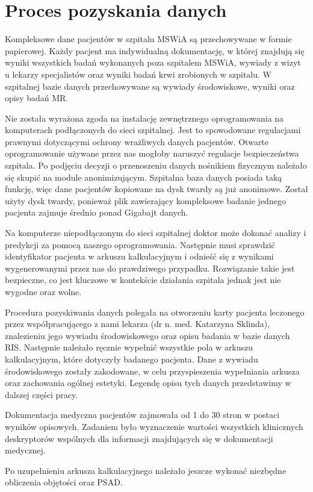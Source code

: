 \documentclass[a4paper,11pt,twoside]{report}
\theoremstyle{definition}
\begin{document}
\section{Proces pozyskania danych}
Kompleksowe dane pacjentów w szpitalu MSWiA są przechowywane w formie papierowej. Każdy pacjent ma indywidualną dokumentację, w której znajdują się wyniki wszystkich badań wykonanych poza szpitalem MSWiA, wywiady z wizyt u lekarzy specjalistów oraz wyniki badań krwi zrobionych w szpitalu. W szpitalnej bazie danych przechowywane są wywiady środowiskowe, wyniki oraz opisy badań MR. 
\par
Nie została wyrażona zgoda na instalację zewnętrznego oprogramowania na komputerach podłączonych do sieci szpitalnej. Jest to spowodowane regulacjami prawnymi dotyczącymi ochrony wrażliwych danych pacjentów. Otwarte oprogramowanie używane przez nas mogłoby naruszyć regulacje bezpieczeństwa szpitala. Po podjęciu decyzji o przenoszeniu danych nośnikiem fizycznym należało się skupić na module anonimizującym. Szpitalna baza danych posiada taką funkcję, więc dane pacjentów kopiowane na dysk twardy są już anonimowe. Został użyty dysk twardy, ponieważ plik zawierający kompleksowe badanie jednego pacjenta zajmuje średnio ponad Gigabajt danych. 
\par
Na komputerze niepodłączonym do sieci szpitalnej doktor może dokonać analizy i predykcji za pomocą naszego oprogramowania. Następnie musi sprawdzić identyfikator pacjenta w arkuszu kalkulacyjnym i odnieść się z wynikami wygenerowanymi przez nas do prawdziwego przypadku. Rozwiązanie takie jest bezpieczne, co jest kluczowe w kontekście działania szpitala jednak jest nie wygodne oraz wolne.
\par
Procedura pozyskiwania danych polegała na otworzeniu karty pacjenta leczonego przez współpracującego z nami lekarza (dr n. med. Katarzyna Sklinda), znalezieniu jego wywiadu środowiskowego oraz opisu badania w bazie danych RIS. Następnie należało ręcznie wypełnić wszystkie pola w arkuszu kalkulacyjnym, które dotyczyły badanego pacjenta. Dane z wywiadu środowiskowego zostały zakodowane, w celu przyspieszenia wypełniania arkusza oraz zachowania ogólnej estetyki. Legendę opisu tych danych przedstawimy w dalszej części pracy. 
\par
Dokumentacja medyczna pacjentów zajmowała od 1 do 30 stron w postaci wyników opisowych.  Zadaniem było wyznaczenie wartości wszystkich klinicznych deskryptorów wspólnych dla informacji znajdujących się w dokumentacji medycznej. 
\par
Po uzupełnieniu arkusza kalkulacyjnego należało jeszcze wykonać niezbędne obliczenia objętości oraz PSAD. 
\end{document}
